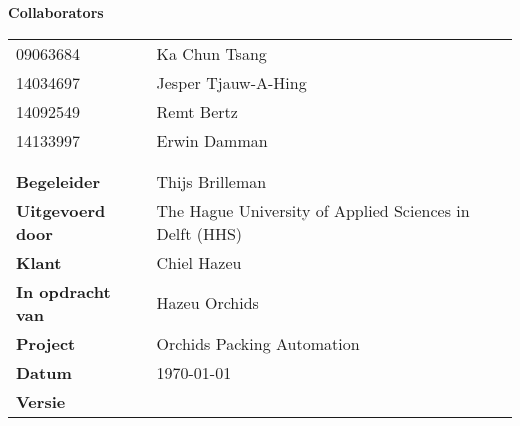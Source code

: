 \begin{titlepage}
	
	\begin{center}
		\LARGE{\textbf{\thistitle}}
	\end{center}
	
	\begin{figure}[h]
	\end{figure}
	
	\bigskip
	\textbf{Collaborators}
	\begin{table}[h]
		\begin{tabular}{@{}ll@{}}
			09063684                 & Ka Chun Tsang                                           \\
			14034697                 & Jesper Tjauw-A-Hing                                     \\
			14092549                 & Remt Bertz                	                           \\
			14133997                 & Erwin Damman                                            \\
			&              										   \\
			&              										   \\
			\textbf{Begeleider}      & Thijs Brilleman                                         \\
			\textbf{Uitgevoerd door} & The Hague University of Applied Sciences in Delft (HHS) \\
			\textbf{Klant}           & Chiel Hazeu                                             \\
			\textbf{In opdracht van} & Hazeu Orchids                                           \\
			\textbf{Project}         & Orchids Packing Automation                         \\
			\textbf{Datum}           & \today                                                  \\
			\textbf{Versie}          & \version          									   \\
		\end{tabular}
	\end{table}
\end{titlepage}


